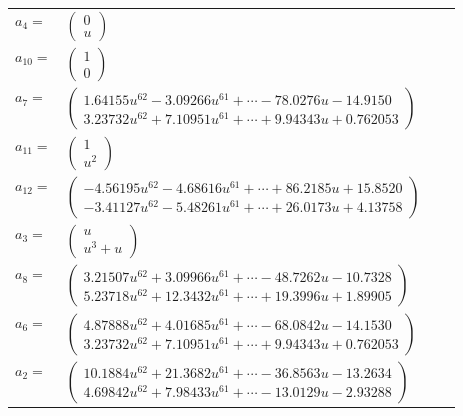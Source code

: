 \documentclass[1p]{elsarticle_modified}
\theoremstyle{definition}
\begin{document}
\begin{tabular}{m{7pt} m{180pt} m{7pt} m{180pt} }
\flushright $a_{4}=$&$\begin{pmatrix}0\\u\end{pmatrix}$ \\
\flushright $a_{10}=$&$\begin{pmatrix}1\\0\end{pmatrix}$ \\
\flushright $a_{7}=$&$\begin{pmatrix}1.64155 u^{62}-3.09266 u^{61}+\cdots-78.0276 u-14.9150\\3.23732 u^{62}+7.10951 u^{61}+\cdots+9.94343 u+0.762053\end{pmatrix}$ \\
\flushright $a_{11}=$&$\begin{pmatrix}1\\u^2\end{pmatrix}$ \\
\flushright $a_{12}=$&$\begin{pmatrix}-4.56195 u^{62}-4.68616 u^{61}+\cdots+86.2185 u+15.8520\\-3.41127 u^{62}-5.48261 u^{61}+\cdots+26.0173 u+4.13758\end{pmatrix}$ \\
\flushright $a_{3}=$&$\begin{pmatrix}u\\u^3+u\end{pmatrix}$ \\
\flushright $a_{8}=$&$\begin{pmatrix}3.21507 u^{62}+3.09966 u^{61}+\cdots-48.7262 u-10.7328\\5.23718 u^{62}+12.3432 u^{61}+\cdots+19.3996 u+1.89905\end{pmatrix}$ \\
\flushright $a_{6}=$&$\begin{pmatrix}4.87888 u^{62}+4.01685 u^{61}+\cdots-68.0842 u-14.1530\\3.23732 u^{62}+7.10951 u^{61}+\cdots+9.94343 u+0.762053\end{pmatrix}$ \\
\flushright $a_{2}=$&$\begin{pmatrix}10.1884 u^{62}+21.3682 u^{61}+\cdots-36.8563 u-13.2634\\4.69842 u^{62}+7.98433 u^{61}+\cdots-13.0129 u-2.93288\end{pmatrix}$ \\

\end{tabular}
\end{document}
